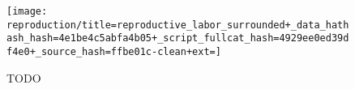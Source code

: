 \begin{figure}[!htbp]
\begin{center}

\texttt{[image: reproduction/title=reproductive\_labor\_surrounded+\_data\_hathash\_hash=4e1be4c5abfa4b05+\_script\_fullcat\_hash=4929ee0ed39df4e0+\_source\_hash=ffbe01c-clean+ext=]}

\caption{
TODO
}
\label{fig:reproduction_surrounted}
\end{center}
\end{figure}
